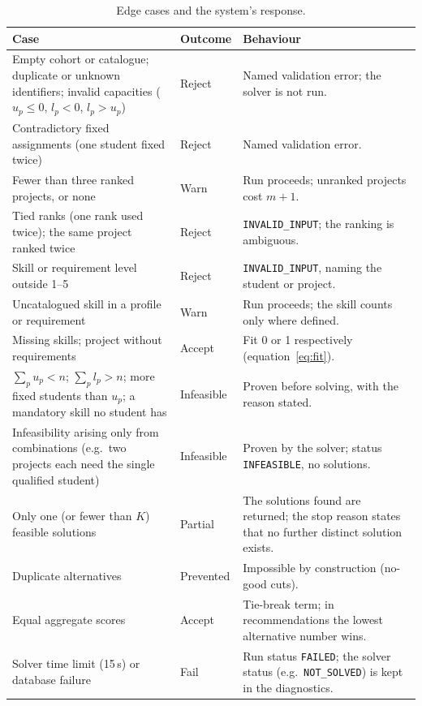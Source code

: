 \documentclass[11pt,a4paper]{article}
\newcommand{\code}[1]{\texttt{#1}}
\begin{document}
\begin{table}[!htbp]
\centering
\small
\caption{Edge cases and the system's response.}
\label{tab:edge}
\begin{tabularx}{\textwidth}{>{\raggedright\arraybackslash}p{5.4cm}>{\raggedright\arraybackslash}p{2.3cm}L}
\toprule
Case & Outcome & Behaviour\\
\midrule
Empty cohort or catalogue; duplicate or unknown identifiers; invalid
  capacities ($u_p \le 0$, $l_p < 0$, $l_p > u_p$)
  & Reject & Named validation error; the solver is not run.\\
Contradictory fixed assignments (one student fixed twice)
  & Reject & Named validation error.\\
Fewer than three ranked projects, or none
  & Warn & Run proceeds; unranked projects cost $m+1$.\\
Tied ranks (one rank used twice); the same project ranked twice
  & Reject & \code{INVALID\_INPUT}; the ranking is ambiguous.\\
Skill or requirement level outside 1--5
  & Reject & \code{INVALID\_INPUT}, naming the student or project.\\
Uncatalogued skill in a profile or requirement
  & Warn & Run proceeds; the skill counts only where defined.\\
Missing skills; project without requirements
  & Accept & Fit 0 or 1 respectively (equation~\eqref{eq:fit}).\\
$\sum_p u_p < n$; $\sum_p l_p > n$; more fixed students than $u_p$;
  a mandatory skill no student has
  & Infeasible & Proven before solving, with the reason stated.\\
Infeasibility arising only from combinations (e.g.\ two projects each need
  the single qualified student)
  & Infeasible & Proven by the solver; status \code{INFEASIBLE}, no
    solutions.\\
Only one (or fewer than $K$) feasible solutions
  & Partial & The solutions found are returned; the stop reason states that
    no further distinct solution exists.\\
Duplicate alternatives
  & Prevented & Impossible by construction (no-good cuts).\\
Equal aggregate scores
  & Accept & Tie-break term; in recommendations the lowest alternative number wins.\\
Solver time limit (15\,s) or database failure
  & Fail & Run status \code{FAILED}; the solver status (e.g.\
    \code{NOT\_SOLVED}) is kept in the diagnostics.\\
\bottomrule
\end{tabularx}
\end{table}
\end{document}
